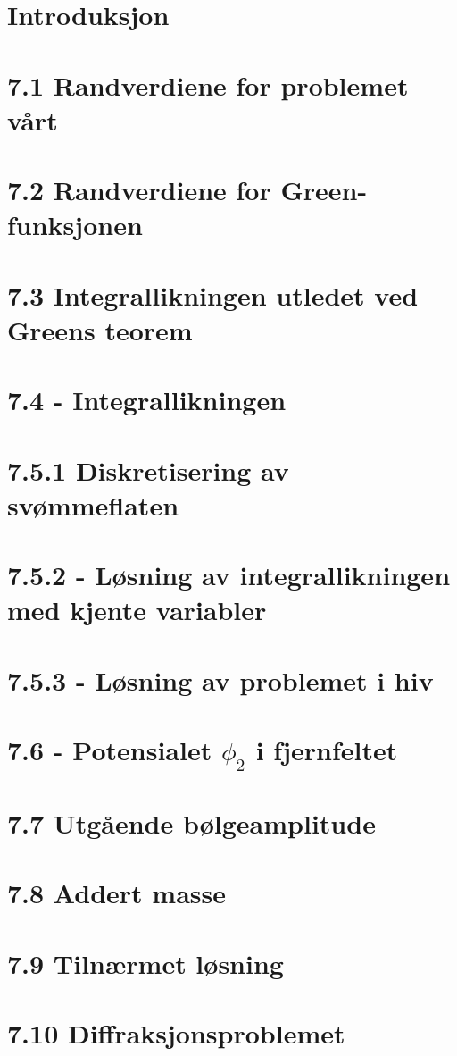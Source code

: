 \section{Introduksjon}
\section{7.1 Randverdiene for problemet vårt}
\section{7.2 Randverdiene for Green-funksjonen}
\section{7.3 Integrallikningen utledet ved Greens teorem}
\section{7.4 - Integrallikningen} 
\section{7.5.1 Diskretisering av svømmeflaten} 
\section{7.5.2 - Løsning av integrallikningen med kjente variabler}
\section{7.5.3 - Løsning av problemet i hiv}
\section{7.6 - Potensialet $\phi_2$ i fjernfeltet}
\section{7.7 Utgående bølgeamplitude}
\section{7.8 Addert masse}
\section{7.9 Tilnærmet løsning}
\section{7.10 Diffraksjonsproblemet}
